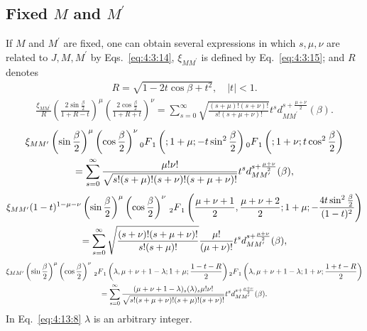 \subsection{Fixed  $M$ and $M^{\prime}$}
 If $M$ and $M^{\prime}$ are fixed, one can obtain several expressions in which $s, \mu, \nu$ are related to $J, M, M^{\prime}$ by Eqs.~\eqref{eq:4:3:14}, $\xi_{M M^{\prime}}$ is defined by Eq.~\eqref{eq:4:3:15}; and $R$ denotes
\begin{gather}
R=\sqrt{1-2 t \cos \beta+t^{2}}, \quad|t|<1 .  \label{eq:4:13:4}
\end{gather}
\begin{gather}
\frac{\xi_{M M^{\prime}}}{R}\left(\frac{2 \sin \frac{\beta}{2}}{1+R-t}\right)^{\mu}\left(\frac{2 \cos \frac{\beta}{2}}{1+R+t}\right)^{\nu}=\sum_{s=0}^{\infty} \sqrt{\frac{(s+\mu)!(s+\nu)!}{s!(s+\mu+\nu)!}} t^{s} d_{M M^{\prime}}^{s+\frac{\mu+\nu}{2}}(\beta) .  \label{eq:4:13:5}
\end{gather}
\begin{gather}
\xi_{M M^{\prime}}\left(\sin \frac{\beta}{2}\right)^{\mu}\left(\cos \frac{\beta}{2}\right)^{\nu} \prescript{}{0}{F}_{1}^{}\left(; 1+\mu ;-t \sin ^{2} \frac{\beta}{2}\right)\prescript{}{0}{F}_{1}^{}\left(; 1+\nu ; t \cos ^{2} \frac{\beta}{2}\right)  \notag\\
=\sum_{s=0}^{\infty} \frac{\mu!\nu!}{\sqrt{s!(s+\mu)!(s+\nu)!(s+\mu+\nu)!}} t^{s} d_{M M^{\prime}}^{s+\frac{\mu+\nu}{2}}(\beta),  \label{eq:4:13:6}
\end{gather}
\begin{gather}
\xi_{M M^{\prime}}(1-t)^{1-\mu-\nu}\left(\sin \frac{\beta}{2}\right)^{\mu}\left(\cos \frac{\beta}{2}\right)^{\nu}{ }\prescript{}{2}{F}_{1}^{}\left(\frac{\mu+\nu+1}{2}, \frac{\mu+\nu+2}{2} ; 1+\mu ;-\frac{4 t \sin^{2} \frac{\beta}{2}}{(1-t)^{2}}\right)  \notag\\
=\sum_{s=0}^{\infty} \sqrt{\frac{(s+\nu)!(s+\mu+\nu)!}{s!(s+\mu)!}} \frac{\mu!}{(\mu+\nu)!} t^{s} d_{M M^{\prime}}^{s+\frac{\mu+\nu}{2}}(\beta),  \label{eq:4:13:7}
\end{gather}
\begin{gather}
\xi_{M M^{\prime}}\left(\sin \frac{\beta}{2}\right)^{\mu}\left(\cos \frac{\beta}{2}\right)^{\nu}{ }\prescript{}{2}{F}_{1}^{}\left(\lambda, \mu+\nu+1-\lambda ; 1+\mu ; \frac{1-t-R}{2}\right)\prescript{}{2}{F}_{1}^{}\left(\lambda, \mu+\nu+1-\lambda ; 1+\nu ; \frac{1+t-R}{2}\right)  \notag\\
=\sum_{s=0}^{\infty} \frac{(\mu+\nu+1-\lambda)_{s}(\lambda)_{s} \mu!\nu!}{\sqrt{s!(s+\mu+\nu)!(s+\mu)!(s+\nu)!}} t^{s} d_{M M^{\prime}}^{s+\frac{\mu+\nu}{2}}(\beta) . \label{eq:4:13:8}
\end{gather}
In Eq.~\eqref{eq:4:13:8} $\lambda$ is an arbitrary integer.

